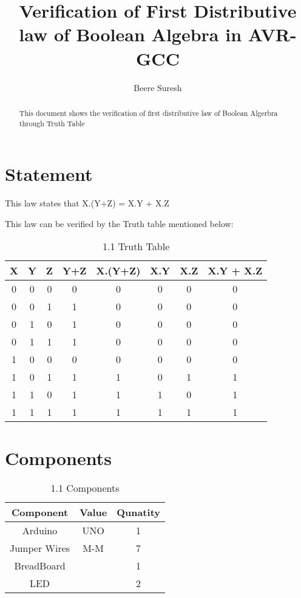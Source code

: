 \documentclass[joirnal,12pt,twocolumn]{IEEEtran}
\title{
Verification of First Distributive law of Boolean Algebra in AVR-GCC
}
\author{Beere Suresh}
\begin{document}
\maketitle
\begin{abstract}
This document shows the verification of first distributive law of Boolean Algerbra through Truth Table
\end{abstract}

\section{Statement}
This law states that 
X.(Y+Z) = X.Y + X.Z

This law can be verified by the Truth table mentioned below:

    \begin{table}[h]
    \centering
    \begin{tabular}{| c | c | c | c | c | c | c | c |}
    \hline
    \textbf{X} & \textbf{Y} & \textbf{Z} & \textbf{Y+Z} & \textbf{X.(Y+Z)} & \textbf{X.Y} & \textbf{X.Z} & \textbf{X.Y + X.Z} \\
    \hline
    0 & 0 & 0 & 0 & 0 & 0 & 0 & 0  \\
    \hline
    0 & 0 & 1 & 1 & 0 & 0 & 0 & 0  \\
    \hline
    0 & 1 & 0 & 1 & 0 & 0 & 0 & 0  \\
    \hline
    0 & 1 & 1 & 1 & 0 & 0 & 0 & 0  \\
    \hline
   1 & 0 & 0 & 0 & 0 & 0 & 0 & 0  \\
    \hline
    1 & 0 & 1 & 1 & 1 & 0 & 1 & 1  \\
    \hline
   1 & 1 & 0 & 1 & 1 & 1 & 0 & 1  \\
    \hline
    1 & 1 & 1 & 1 & 1 & 1 & 1 & 1  \\
    \hline
    \end{tabular}
    \caption{1.1 Truth Table}
    \label{tab:my_label}
 \end{table}
\section{Components}
\begin{table}[h]
    \centering
    \begin{tabular}{| c | c | c |}
       \hline
       \textbf{Component}  &  \textbf{Value}  &  \textbf{Qunatity}\\
       \hline
         Arduino  & UNO & 1  \\
         \hline
         Jumper Wires  &  M-M  &  7  \\
         \hline
         BreadBoard  &    &  1\\
         \hline
        LED   &   &  2 \\
          \hline

    \end{tabular}
    \caption{1.1 Components}
    \label{tab:my_label}
\end{table}
\end{document}
